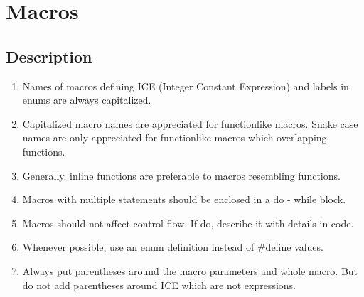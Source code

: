 \section{Macros}
\subsection{Description}
\begin{enumerate}
    \item Names of macros defining ICE (Integer Constant Expression) and labels in enums are always capitalized.
    \item Capitalized macro names are appreciated for functionlike macros. Snake case names are only appreciated for functionlike macros which overlapping functions.
    \item Generally, inline functions are preferable to macros resembling functions.
    \item Macros with multiple statements should be enclosed in a do - while block.
    \item Macros should not affect control flow. If do, describe it with details in code.
    \item Whenever possible, use an enum definition instead of \#define values.
    \item Always put parentheses around the macro parameters and whole macro. But do not add parentheses around ICE which are not expressions.
\end{enumerate}

